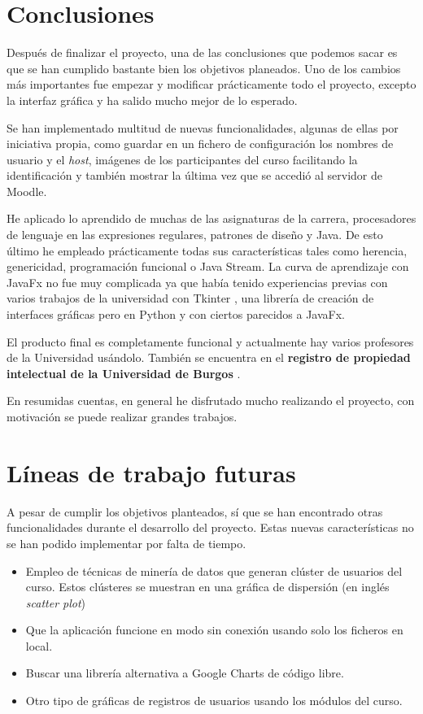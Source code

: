 
\section{Conclusiones}

Después de finalizar el proyecto, una de las conclusiones que podemos sacar es que se han cumplido bastante bien los objetivos planeados. Uno de los cambios más importantes fue empezar y modificar prácticamente todo el proyecto, excepto la interfaz gráfica y ha salido mucho mejor de lo esperado. 

Se han implementado multitud de nuevas funcionalidades, algunas de ellas por iniciativa propia, como guardar en un fichero de configuración los nombres de usuario y el \textit{host}, imágenes de los participantes del curso facilitando la identificación y también mostrar la última vez que se accedió al servidor de Moodle.

He aplicado lo aprendido de muchas de las asignaturas de la carrera, procesadores de lenguaje en las expresiones regulares, patrones de diseño y Java. De esto último he empleado prácticamente todas sus características tales como herencia, genericidad, programación funcional o Java Stream. La curva de aprendizaje con JavaFx no fue muy complicada ya que había tenido experiencias previas con varios trabajos de la universidad con Tkinter \cite{noauthor_tkinter_nodate}, una librería de creación de interfaces gráficas pero en Python y con ciertos parecidos a JavaFx.

El producto final es completamente funcional y actualmente hay varios profesores de la Universidad usándolo. También se encuentra en el \textbf{registro de propiedad intelectual  de la Universidad de Burgos} \cite{noauthor_registros_nodate}.

En resumidas cuentas, en general he disfrutado mucho realizando el proyecto, con motivación se puede realizar grandes trabajos.

\section{Líneas de trabajo futuras}

A pesar de cumplir los objetivos planteados, sí que se han encontrado otras funcionalidades durante el desarrollo del proyecto. Estas nuevas características no se han podido implementar por falta de tiempo.

\begin{itemize}
	\item Empleo de técnicas de minería de datos que generan clúster de usuarios del curso. Estos clústeres se muestran en una gráfica de dispersión (en inglés \textit{scatter plot})
	\item Que la aplicación funcione en modo sin conexión usando solo los ficheros en local. 
	\item Buscar una librería alternativa a Google Charts \cite{noauthor_charts_nodate} de código libre.
	\item Otro tipo de gráficas de registros de usuarios usando los módulos del curso.
\end{itemize}
